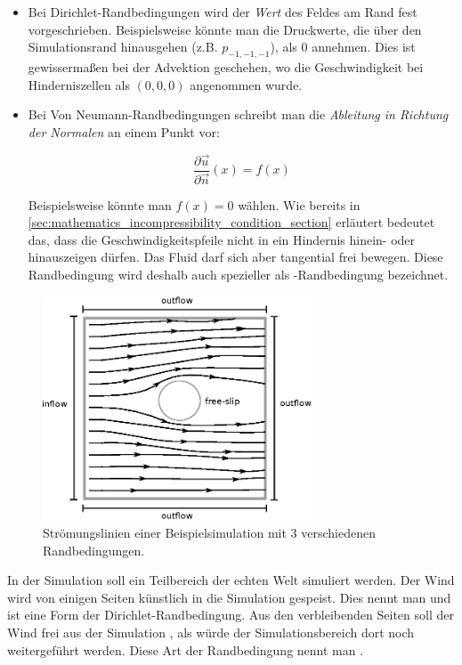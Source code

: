 \begin{itemize}
\item
	Bei Dirichlet-Randbedingungen wird der \emph{Wert} des Feldes am Rand
	fest vorgeschrieben. Beispielsweise könnte man die Druckwerte, die über
	den Simulationsrand hinausgehen (z.B. $p_{-1,-1,-1}$), als $0$ annehmen.
	Dies ist gewissermaßen bei der Advektion geschehen, wo die
	Geschwindigkeit bei Hinderniszellen als $(0,0,0)$ angenommen wurde.
\item
	Bei Von Neumann-Randbedingungen schreibt man die \emph{Ableitung in
	Richtung der Normalen} an einem Punkt vor:

	\begin{equation}
	\frac{
		\partial \vec{u}
	}
	{
		\partial \vec{n}
	}(x)
	=
	f(x)
	\end{equation}

	Beispielsweise könnte man $f(x)=0$ wählen. Wie bereits in
	\autoref{sec:mathematics_incompressibility_condition_section} erläutert
	bedeutet das, dass die Geschwindigkeitspfeile nicht in ein Hindernis
	hinein- oder hinauszeigen dürfen. Das Fluid darf sich aber tangential
	frei bewegen. Diese Randbedingung wird deshalb auch spezieller als
	-Randbedingung bezeichnet.
\end{itemize}

\begin{figure}[ht]
\centering
\includegraphics[width=8cm]{images/boundary_types}
\caption{Strömungslinien einer Beispielsimulation mit 3 verschiedenen Randbedingungen.}
\label{fig:stam_boundary_types}
\end{figure}

In der Simulation soll ein Teilbereich der echten Welt simuliert werden. Der
Wind wird von einigen Seiten künstlich in die Simulation gespeist. Dies nennt
man  und ist eine Form der
Dirichlet-Randbedingung. Aus den verbleibenden Seiten soll der Wind frei aus der
Simulation , als würde der Simulationsbereich dort
noch weitergeführt werden. Diese Art der Randbedingung nennt man
.


